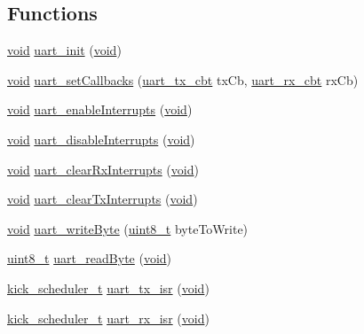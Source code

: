 \subsection*{Functions}
\begin{DoxyCompactItemize}
\item 
\hyperlink{usb__devapi_8h_afabf60e7f57651d6d595a02c75f07cd0}{void} \hyperlink{group__uart_ga0c0ca72359ddf28dcd15900dfba19343}{uart\+\_\+init} (\hyperlink{usb__devapi_8h_afabf60e7f57651d6d595a02c75f07cd0}{void})
\item 
\hyperlink{usb__devapi_8h_afabf60e7f57651d6d595a02c75f07cd0}{void} \hyperlink{group__uart_ga9a390382a1fb16e9d83c1f5a34afb6e3}{uart\+\_\+set\+Callbacks} (\hyperlink{group__uart_gae005b96f0b18aecb814f4979c3e33408}{uart\+\_\+tx\+\_\+cbt} tx\+Cb, \hyperlink{group__uart_gab8f8d6449d6a994dfb5ede3fca7ac4e2}{uart\+\_\+rx\+\_\+cbt} rx\+Cb)
\item 
\hyperlink{usb__devapi_8h_afabf60e7f57651d6d595a02c75f07cd0}{void} \hyperlink{group__uart_ga19d6ac545de3750804fcdd7d5c6ae41e}{uart\+\_\+enable\+Interrupts} (\hyperlink{usb__devapi_8h_afabf60e7f57651d6d595a02c75f07cd0}{void})
\item 
\hyperlink{usb__devapi_8h_afabf60e7f57651d6d595a02c75f07cd0}{void} \hyperlink{group__uart_ga138d10923b5872cc48a30802f9a85308}{uart\+\_\+disable\+Interrupts} (\hyperlink{usb__devapi_8h_afabf60e7f57651d6d595a02c75f07cd0}{void})
\item 
\hyperlink{usb__devapi_8h_afabf60e7f57651d6d595a02c75f07cd0}{void} \hyperlink{group__uart_gad4ce3cb232f8a2a473976527d3497fc6}{uart\+\_\+clear\+Rx\+Interrupts} (\hyperlink{usb__devapi_8h_afabf60e7f57651d6d595a02c75f07cd0}{void})
\item 
\hyperlink{usb__devapi_8h_afabf60e7f57651d6d595a02c75f07cd0}{void} \hyperlink{group__uart_gae5f8c18830d4a12c2ccd5aaab95aa563}{uart\+\_\+clear\+Tx\+Interrupts} (\hyperlink{usb__devapi_8h_afabf60e7f57651d6d595a02c75f07cd0}{void})
\item 
\hyperlink{usb__devapi_8h_afabf60e7f57651d6d595a02c75f07cd0}{void} \hyperlink{group__uart_ga7a4111d6f4c172637301fe00e344e77f}{uart\+\_\+write\+Byte} (\hyperlink{_p_e___types_8h_aba7bc1797add20fe3efdf37ced1182c5}{uint8\+\_\+t} byte\+To\+Write)
\item 
\hyperlink{_p_e___types_8h_aba7bc1797add20fe3efdf37ced1182c5}{uint8\+\_\+t} \hyperlink{group__uart_ga9b9f9e22d7f34dd0a2fe9c3456d12987}{uart\+\_\+read\+Byte} (\hyperlink{usb__devapi_8h_afabf60e7f57651d6d595a02c75f07cd0}{void})
\item 
\hyperlink{group__board_gac9ebdcc0a4f3c8422f5f4f0fbbe0ded0}{kick\+\_\+scheduler\+\_\+t} \hyperlink{group__uart_ga20f850e163363a82ca205c9fdba31860}{uart\+\_\+tx\+\_\+isr} (\hyperlink{usb__devapi_8h_afabf60e7f57651d6d595a02c75f07cd0}{void})
\item 
\hyperlink{group__board_gac9ebdcc0a4f3c8422f5f4f0fbbe0ded0}{kick\+\_\+scheduler\+\_\+t} \hyperlink{group__uart_ga0c9173d92e6ad1afee36bf6face8d92e}{uart\+\_\+rx\+\_\+isr} (\hyperlink{usb__devapi_8h_afabf60e7f57651d6d595a02c75f07cd0}{void})
\end{DoxyCompactItemize}


